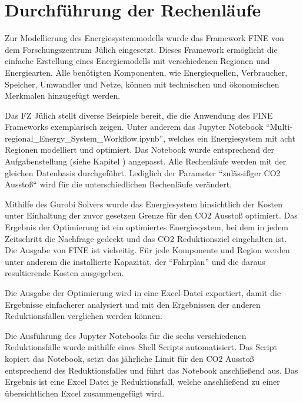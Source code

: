 \section{Durchführung der Rechenläufe}
Zur Modellierung des Energiesystemmodells wurde das Framework FINE von dem Forschungszentrum Jülich eingesetzt.
Dieses Framework ermöglicht die einfache Erstellung eines Energiemodells mit verschiedenen Regionen und Energiearten. Alle benötigten Komponenten, wie Energiequellen, Verbraucher, Speicher, Umwandler und Netze, können mit technischen und ökonomischen Merkmalen hinzugefügt werden. 

Das FZ Jülich stellt diverse Beispiele bereit, die die Anwendung des FINE Frameworks exemplarisch zeigen. Unter anderem das Jupyter Notebook ``Multi-regional\_Energy\_System\_Workflow.ipynb'', welches ein Energiesystem mit acht Regionen modelliert und optimiert. Das Notebook wurde entsprechend der Aufgabenstellung (siehe Kapitel ) angepasst. Alle Rechenläufe werden mit der gleichen Datenbasis durchgeführt. Lediglich der Parameter ``zulässißger CO2 Ausstoß`` wird für die unterschiedlichen Rechenläufe verändert. 

Mithilfe des Gurobi Solvers wurde das Energiesystem hinsichtlich der Kosten unter Einhaltung der zuvor gesetzen Grenze für den CO2 Ausstoß optimiert. Das Ergebnis der Optimierung ist ein optimiertes Energiesystem, bei dem in jedem Zeitschritt die Nachfrage gedeckt und das CO2 Reduktionsziel eingehalten ist. Die Ausgabe von FINE ist vielseitig. Für jede Komponente und Region werden unter anderem die installierte Kapazität, der ``Fahrplan'' und die daraus resultierende Kosten ausgegeben.

Die Ausgabe der Optimierung wird in eine Excel-Datei exportiert, damit die Ergebnisse einfacherer analysiert und mit den Ergebnissen der anderen Reduktionsfällen verglichen werden können. 

Die Ausführung des Jupyter Notebooks für die sechs verschiedenen Reduktionsfälle wurde mithilfe eines Shell Scripts automatisiert. Das Script kopiert das Notebook, setzt das jährliche Limit für den CO2 Ausstoß entsprechend des Reduktionsfalles und führt das Notebook anschließend aus. Das Ergebnis ist eine Excel Datei je Reduktionsfall, welche anschließend zu einer übersichtlichen Excel zusammengefügt wird.
